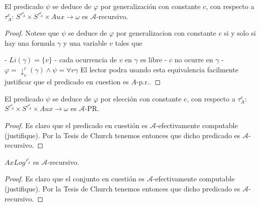   \begin{lemma} \label{lemma_104}
    \PN El predicado \CL$\psi$ se deduce de $\varphi$ por generalización con constante $c$, con respecto a
    $\tau^{e}_{A}$\CR: $S^{\tau_{A}^{e}} \times S^{\tau_{A}^{e}} \times Aux \rightarrow \omega$ es $\mathcal{A}$-recursivo.
  \end{lemma}
  \begin{proof}
    Notese que $\psi $ se deduce de $\varphi $ por generalizacion con constante $ c$ si y solo si hay una formula $\gamma $ y una variable $v$ tales que

    - $Li(\gamma )=\{v\}$
    - cada ocurrencia de $v$ en $\gamma $ es libre
    - $c$ no ocurre en $\gamma $
    - $\varphi =\mathrm{\downarrow }_{v}^{c}(\gamma )\wedge \psi =\forall v\gamma $
    El lector podra usando esta equivalencia facilmente justificar que el predicado en cuestion es $A$-p.r..
  \end{proof}

  \begin{lemma} \label{lemma_105}
    \PN El predicado \CL$\psi$ se deduce de $\varphi$ por elección con constante $e$, con respecto a $\tau^{e}_{A}$\CR:
    $S^{\tau_{A}^{e}} \times S^{\tau_{A}^{e}} \times Aux \rightarrow \omega$ es $\mathcal{A}$-PR.
  \end{lemma}
  \begin{proof}
    \PN Es claro que el predicado en cuestión es $\mathcal{A}$-efectivamente computable (justifique). Por la Tesis de
    Church tenemos entonces que dicho predicado es $\mathcal{A}$-recursivo.
  \end{proof}

  \begin{lemma} \label{lemma_106}
    \PN $AxLog^{\tau_{A}^{e}}$ es $\mathcal{A}$-recursivo.
  \end{lemma}
  \begin{proof}
    \PN Es claro que el conjunto en cuestión es $\mathcal{A}$-efectivamente computable (justifique). Por la Tesis de
    Church tenemos entonces que dicho predicado es $\mathcal{A}$-recursivo.
  \end{proof}

